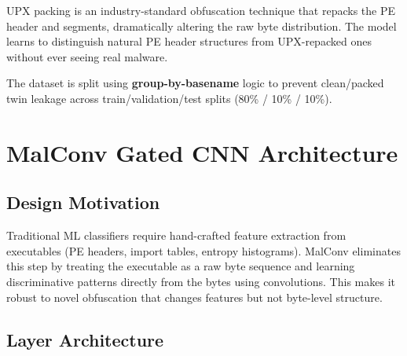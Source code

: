 \documentclass[12pt,a4paper]{article}
\begin{document}
\noindent
UPX packing is an industry-standard obfuscation technique that repacks the PE
header and segments, dramatically altering the raw byte distribution.  The model
learns to distinguish natural PE header structures from UPX-repacked ones
without ever seeing real malware.

The dataset is split using \textbf{group-by-basename} logic to prevent
clean/packed twin leakage across train/validation/test splits
(80\% / 10\% / 10\%).

\section{MalConv Gated CNN Architecture}

\subsection{Design Motivation}
Traditional ML classifiers require hand-crafted feature extraction from
executables (PE headers, import tables, entropy histograms).  MalConv eliminates
this step by treating the executable as a raw byte sequence and learning
discriminative patterns directly from the bytes using convolutions.  This makes
it robust to novel obfuscation that changes features but not byte-level
structure.

\subsection{Layer Architecture}
\end{document}
